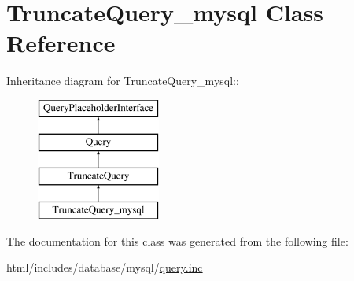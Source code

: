 \hypertarget{classTruncateQuery__mysql}{
\section{TruncateQuery\_\-mysql Class Reference}
\label{classTruncateQuery__mysql}
}
Inheritance diagram for TruncateQuery\_\-mysql::\begin{figure}[H]
\begin{center}
\leavevmode
\includegraphics[height=4cm]{classTruncateQuery__mysql}
\end{center}
\end{figure}


The documentation for this class was generated from the following file:\begin{DoxyCompactItemize}
\item 
html/includes/database/mysql/\hyperlink{mysql_2query_8inc}{query.inc}\end{DoxyCompactItemize}
